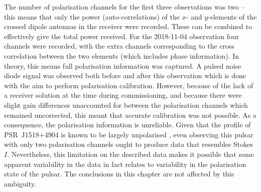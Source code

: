 The number of polarisation channels for the first three observations was two -- this means that only the power (auto-correlations) of the $x$- and $y$-elements of the crossed dipole antennas in the receiver were recorded. These can be combined to effectively give the total power received. For the 2018-11-04 observation four channels were recorded, with the extra channels corresponding to the cross correlation between the two elements (which includes phase information). In theory, this means full polarisation information was captured. A pulsed noise diode signal was observed both before and after this observation which is done with the aim to perform polarisation calibration. However, because of the lack of a receiver solution at the time during commissioning, and because there were slight gain differences unaccounted for between the polarisation channels which remained uncorrected, this meant that accurate calibration was not possible. As a consequence, the polarisation information is unreliable. Given that the profile of PSR~J1518+4904 is known to be largely unpolarised \citep{XKJ+1998, STCx1999,HDSL2009}, even observing this pulsar with only two polarisation channels ought to produce data that resembles Stokes $I$. Nevertheless, this limitation on the described data makes it possible that some apparent variability in the data in fact relates to variability in the polarisation state of the pulsar. The conclusions in this chapter are not affected by this ambiguity.

